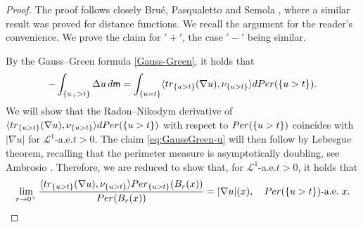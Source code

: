 \documentclass[11pt, reqno]{amsart}
\numberwithin{equation}{section}
\begin{document}
	\begin{proof} 
		The proof follows closely Bru\'e, Pasqualetto and Semola \cite[Proposition 6.1]{BPS-ASNS}, where a similar result was proved for distance functions. We recall the argument for the reader's convenience.
		We prove the claim for $'+'$, the case $'-'$  being similar.
  
		By the Gauss--Green formula \eqref{Gauss-Green}, it holds that
		\begin{equation}\label{eq:GGDeltau}
			-\int_{\{u_+>t\}}\Delta u\, {\rm d}{\sf m}=\int_{\{u=t\}} \langle {\rm tr}_{\{u>t\}}(\nabla u), \nu_{\{u>t\}} \rangle {\rm d}{\rm Per}(\{u>t\}).
		\end{equation}
		We will show that the Radon--Nikodym derivative of $\langle {\rm tr}_{\{u>t\}}(\nabla u), \nu_{\{u>t\}} \rangle {\rm d}{\rm Per}(\{u>t\})$ with respect to ${\rm Per}(\{u>t\})$ coincides with $|\nabla u|$  for $\mathcal L^1$-a.e.\;$t>0$. The claim \eqref{eq:GaussGreen-u} will then follow by Lebesgue theorem, recalling that the perimeter measure is asymptotically doubling, see Ambrosio \cite[Corollary 5.8]{Ambrosio2002}. Therefore, we are reduced to show that, for $\mathcal L^1$-a.e.\;$t>0$, it holds that
		\begin{equation}\label{eq:blowupTrace}
			\lim_{r\to 0^+} \frac{\langle {\rm tr}_{\{u>t\}}(\nabla u), \nu_{\{u>t\}} \rangle {\rm Per}_{\{u>t\}}(B_r(x))} {{\rm Per}(B_r(x))} =  |\nabla u| (x), \quad {\rm Per}(\{u>t\})\text{-a.e.}\;x.
		\end{equation}
		

\end{proof}
\end{document}
